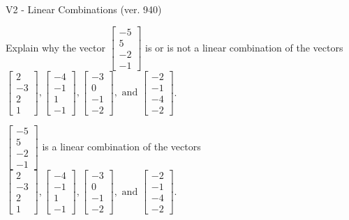 \begin{exercise}
  \begin{exerciseTitle}V2 - Linear Combinations (ver. 940)\end{exerciseTitle}
  \begin{exerciseStatement}
    Explain why the vector \(\left[\begin{array}{c}
-5 \\
5 \\
-2 \\
-1
\end{array}\right]\)  is or is not a linear 
	combination of the vectors \(\left[\begin{array}{c}
2 \\
-3 \\
2 \\
1
\end{array}\right] , \left[\begin{array}{c}
-4 \\
-1 \\
1 \\
-1
\end{array}\right] , \left[\begin{array}{c}
-3 \\
0 \\
-1 \\
-2
\end{array}\right] , \text{ and } \left[\begin{array}{c}
-2 \\
-1 \\
-4 \\
-2
\end{array}\right]\).
	


  \end{exerciseStatement}
  \begin{exerciseAnswer}
   \(\left[\begin{array}{c}
-5 \\
5 \\
-2 \\
-1
\end{array}\right]\) 
  	 is  
	a linear combination of the vectors \(\left[\begin{array}{c}
2 \\
-3 \\
2 \\
1
\end{array}\right] , \left[\begin{array}{c}
-4 \\
-1 \\
1 \\
-1
\end{array}\right] , \left[\begin{array}{c}
-3 \\
0 \\
-1 \\
-2
\end{array}\right] , \text{ and } \left[\begin{array}{c}
-2 \\
-1 \\
-4 \\
-2
\end{array}\right]\).


\end{exerciseAnswer}
\end{exercise}
